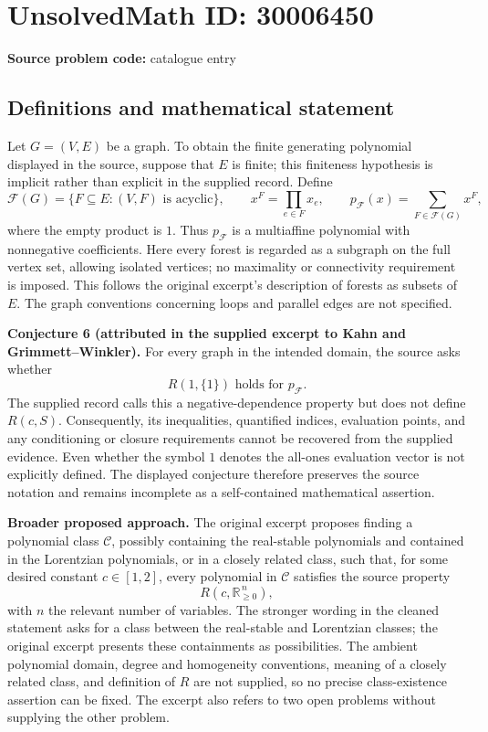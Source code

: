 \documentclass[11pt]{article}
\newcommand{\R}{\mathbb{R}}
\begin{document}
\section*{UnsolvedMath ID: 30006450}
\textbf{Source problem code:} catalogue entry
\subsection{Definitions and mathematical statement}
Let \(G=(V,E)\) be a graph. To obtain the finite generating polynomial displayed in the source, suppose that \(E\) is finite; this finiteness hypothesis is implicit rather than explicit in the supplied record. Define
\[
\mathcal F(G)=\{F\subseteq E:(V,F)\text{ is acyclic}\},\qquad
x^F=\prod_{e\in F}x_e,\qquad
p_{\mathcal F}(x)=\sum_{F\in\mathcal F(G)}x^F,
\]
where the empty product is \(1\). Thus \(p_{\mathcal F}\) is a multiaffine polynomial with nonnegative coefficients. Here every forest is regarded as a subgraph on the full vertex set, allowing isolated vertices; no maximality or connectivity requirement is imposed. This follows the original excerpt's description of forests as subsets of \(E\). The graph conventions concerning loops and parallel edges are not specified.

\textbf{Conjecture 6 (attributed in the supplied excerpt to Kahn and Grimmett--Winkler).} For every graph in the intended domain, the source asks whether
\[
R(1,\{1\})\text{ holds for }p_{\mathcal F}.
\]
The supplied record calls this a negative-dependence property but does not define \(R(c,S)\). Consequently, its inequalities, quantified indices, evaluation points, and any conditioning or closure requirements cannot be recovered from the supplied evidence. Even whether the symbol \(1\) denotes the all-ones evaluation vector is not explicitly defined. The displayed conjecture therefore preserves the source notation and remains incomplete as a self-contained mathematical assertion.

\textbf{Broader proposed approach.} The original excerpt proposes finding a polynomial class \(\mathcal C\), possibly containing the real-stable polynomials and contained in the Lorentzian polynomials, or in a closely related class, such that, for some desired constant \(c\in[1,2]\), every polynomial in \(\mathcal C\) satisfies the source property
\[
R(c,\R_{\geq0}^{\,n}),
\]
with \(n\) the relevant number of variables. The stronger wording in the cleaned statement asks for a class between the real-stable and Lorentzian classes; the original excerpt presents these containments as possibilities. The ambient polynomial domain, degree and homogeneity conventions, meaning of a closely related class, and definition of \(R\) are not supplied, so no precise class-existence assertion can be fixed. The excerpt also refers to two open problems without supplying the other problem.
\end{document}
